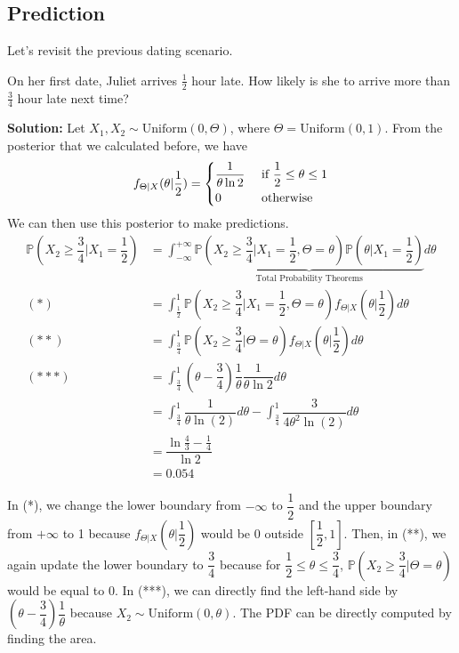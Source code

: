 \subsection{Prediction} 
Let's revisit the previous dating scenario. 
\begin{eg}
  On her first date, Juliet arrives \(\frac{1}{2}\) hour late. How likely is she to arrive more than \(\frac{3}{4}\) hour late next time? 

  \textbf{Solution:} 
  Let \(X_1, X_2 \sim \text{Uniform}(0, \Theta)\), where \(\Theta = \text{Uniform}(0, 1)\). 
  From the posterior that we calculated before, we have 
  \[
    f_{\Theta \vert X} (\theta \vert \dfrac{1}{2}) = \begin{dcases}
      \dfrac{1}{\theta \ln 2} &\text{ if } \dfrac{1}{2} \leq \theta \leq 1 \\
      0 &\text{ otherwise} 
    \end{dcases}
  \]
  We can then use this posterior to make predictions. 
  \[
    \begin{aligned}
      \mathbb{P}(X_2 \geq \dfrac{3}{4} \vert X_1 = \dfrac{1}{2}) &= \int_{-\infty}^{+\infty} \underbrace{\mathbb{P}\left(X_2 \geq \dfrac{3}{4} \vert X_1 = \dfrac{1}{2}, \Theta = \theta\right) \mathbb{P} \left(\theta \vert X_1 = \dfrac{1}{2}\right)}_{\text{Total Probability Theorems}} d \theta \\
      (*) &= \int_{\frac{1}{2}}^{1} \mathbb{P}\left(X_2 \geq \dfrac{3}{4} \vert X_1 = \dfrac{1}{2}, \Theta = \theta\right) f_{\Theta \vert X} (\theta \vert \dfrac{1}{2}) d \theta \\
      (**) &= \int_{\frac{3}{4}}^{1} \mathbb{P}\left(X_2 \geq \dfrac{3}{4} \vert \Theta = \theta\right) f_{\Theta \vert X} (\theta \vert \dfrac{1}{2}) d \theta \\
      (***) &= \int_{\frac{3}{4}}^{1} (\theta - \dfrac{3}{4}) \dfrac{1}{\theta} \dfrac{1}{\theta \ln 2} d \theta \\
      &= \int_{\frac{3}{4}}^{1} \dfrac{1}{\theta \ln{(2)}} d \theta - \int_{\frac{3}{4}}^{1} \dfrac{3}{4\theta^{2} \ln{(2)}} d \theta \\
      &= \dfrac{\ln \frac{4}{3} - \frac{1}{4}}{\ln 2} \\
      &= 0.054
    \end{aligned}
  \]

  In (*), we change the lower boundary from \(-\infty\) to \(\dfrac{1}{2}\) and the upper boundary from \(+\infty\) to 1 because \(f_{\Theta \vert X} (\theta \vert \dfrac{1}{2})\) would be 0 outside \([\dfrac{1}{2}, 1]\). Then, in (**), we again update the lower boundary to \(\dfrac{3}{4}\) because for \(\dfrac{1}{2} \leq \theta \leq \dfrac{3}{4}\), \(\mathbb{P}(X_2 \geq \dfrac{3}{4} \vert \Theta = \theta)\) would be equal to 0. In (***), we can directly find the left-hand side by \((\theta - \dfrac{3}{4}) \dfrac{1}{\theta}\) because \(X_2 \sim \text{Uniform}(0, \theta)\). The PDF can be directly computed by finding the area.
\end{eg}

